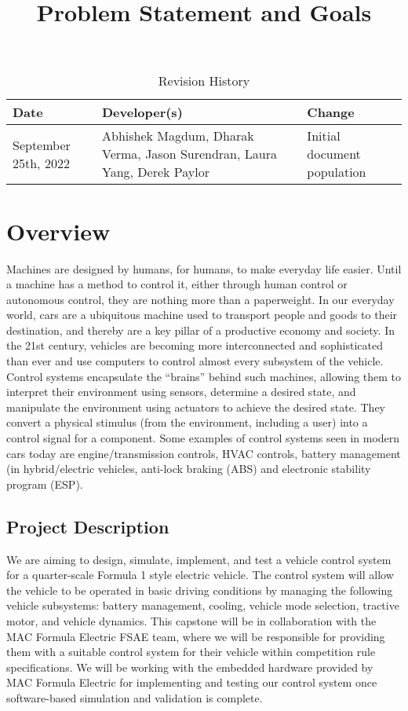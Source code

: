 \documentclass{article}
\title{Problem Statement and Goals\\\progname}
\author{\authname}
\date{}
\begin{document}
\maketitle

\begin{table}[hp]
\caption{Revision History} \label{TblRevisionHistory}
\begin{tabularx}{\textwidth}{XXX}
\toprule
\textbf{Date} & \textbf{Developer(s)} & \textbf{Change}\\
\midrule
September 25th, 2022 & Abhishek Magdum, Dharak Verma, Jason Surendran, Laura Yang, Derek Paylor & Initial document population\\
\bottomrule
\end{tabularx}
\end{table}

\section{Overview}
Machines are designed by humans, for humans, 
to make everyday life easier. Until a machine has a 
method to control it, either through human control or 
autonomous control, they are nothing more than a paperweight. 
In our everyday world, cars are a ubiquitous machine used to 
transport people and goods to their destination, and thereby 
are a key pillar of a productive economy and society. In the 
21st century, vehicles are becoming more interconnected and 
sophisticated than ever and use computers to control almost 
every subsystem of the vehicle. Control systems encapsulate 
the “brains” behind such machines, allowing them to interpret 
their environment using sensors, determine a desired state, and 
manipulate the environment using actuators to achieve the 
desired state. They convert a physical stimulus (from the 
environment, including a user) into a control signal for a 
component. Some examples of control systems seen in modern 
cars today are engine/transmission controls, HVAC controls, 
battery management (in hybrid/electric vehicles, anti-lock 
braking (ABS) and electronic stability program (ESP).

\subsection{Project Description}
We are aiming to design, simulate, implement, and test a vehicle 
control system for a quarter-scale Formula 1 style electric vehicle. 
The control system will allow the vehicle to be operated in basic driving 
conditions by managing the following vehicle subsystems: battery management, 
cooling, vehicle mode selection, tractive motor, and vehicle dynamics. 
This capstone will be in collaboration with the MAC Formula Electric FSAE team, 
where we will be responsible for providing them with a suitable control 
system for their vehicle within competition rule specifications. We will 
be working with the embedded hardware provided by MAC Formula Electric for 
implementing and testing our control system once software-based simulation and 
validation is complete.
\end{document}
